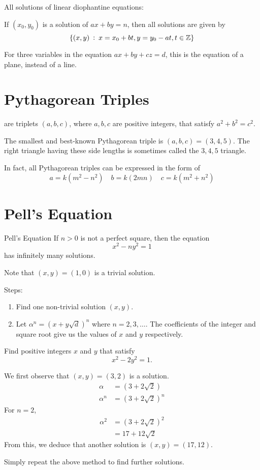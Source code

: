 All solutions of linear diophantine equations:
\begin{thrm}{}{}
If $(x_0,y_0)$ is a solution of $ax + by = n$, then all solutions are given by 
\[ \{(x,y)\::\:x = x_0 + bt, y = y_0 - at,t \in \mathbb Z\} \]
\end{thrm}

For three variables in the equation $ax + by + cz = d$, this is the equation of a plane, instead of a line.

\section{Pythagorean Triples}
 are triplets $(a,b,c)$, where $a,b,c$ are positive integers, that satisfy $a^2+b^2=c^2$.

The smallest and best-known Pythagorean triple is $(a,b,c)=(3,4,5)$. The right triangle having these side lengths is sometimes called the $3, 4, 5$ triangle.

In fact, all Pythagorean triples can be expressed in the form of 
\[ a=k(m^2-n^2) \quad b=k(2mn) \quad c=k(m^2+n^2) \]

\section{Pell's Equation}
\begin{thrm}{Pell's Equation}{} 
If $n>0$ is not a perfect square, then the equation 
\[ x^2-ny^2=1 \]
has infinitely many solutions.
\end{thrm}
Note that $(x,y)=(1,0)$ is a trivial solution.

Steps:
\begin{enumerate}
	\item Find one non-trivial solution $(x,y)$.
	\item Let $\alpha^n = (x+y\sqrt{d})^n$ where $n=2,3,\dots$. The coefficients of the integer and square root give us the values of $x$ and $y$ respectively.
\end{enumerate}

\begin{exmp}{}{}
Find positive integers $x$ and $y$ that satisfy \[ x^2-2y^2=1. \] 
\end{exmp}

\begin{solution}
We first observe that $(x,y)=(3,2)$ is a solution.
\begin{align*}
\alpha &= (3+2\sqrt{2}) \\
\alpha^n &= (3+2\sqrt{2})^n
\end{align*}
For $n=2$,
\begin{align*}
\alpha^2 &= (3+2\sqrt{2})^2 \\&= 17 + 12\sqrt{2}
\end{align*}
From this, we deduce that another solution is $(x,y)=(17,12)$.

Simply repeat the above method to find further solutions.
\end{solution}

